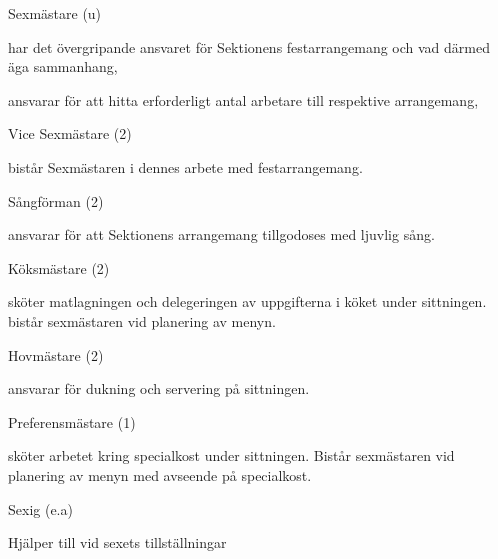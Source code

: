 \documentclass[10pt]{article}
\begin{document}
\begin{emptylist}
    \item Sexmästare (u)
        \begin{dashlist}
            \item har det övergripande ansvaret för Sektionens
                festarrangemang och vad därmed äga sammanhang,
            \item ansvarar för att hitta erforderligt antal arbetare
                till respektive arrangemang,
        \end{dashlist}
    \item Vice Sexmästare (2)
        \begin{dashlist}
            \item bistår Sexmästaren i dennes arbete med festarrangemang.
        \end{dashlist}
    \item Sångförman (2)
        \begin{dashlist}
            \item ansvarar för att Sektionens arrangemang tillgodoses
                med ljuvlig sång.
        \end{dashlist}
    \item Köksmästare (2)
        \begin{dashlist}
        \item sköter matlagningen och delegeringen av uppgifterna i köket under sittningen. bistår sexmästaren vid planering
        av menyn.
        \end{dashlist}
    \item Hovmästare (2)
        \begin{dashlist}
        \item ansvarar för dukning och servering på sittningen.
        \end{dashlist}
    \item Preferensmästare (1)
        \begin{dashlist}
        \item sköter arbetet kring specialkost under sittningen. Bistår sexmästaren vid planering av menyn med avseende på
        specialkost.
        \end{dashlist}
    \item Sexig (e.a)
        \begin{dashlist}
        \item Hjälper till vid sexets tillställningar
        \end{dashlist}

\end{emptylist}
\end{document}
